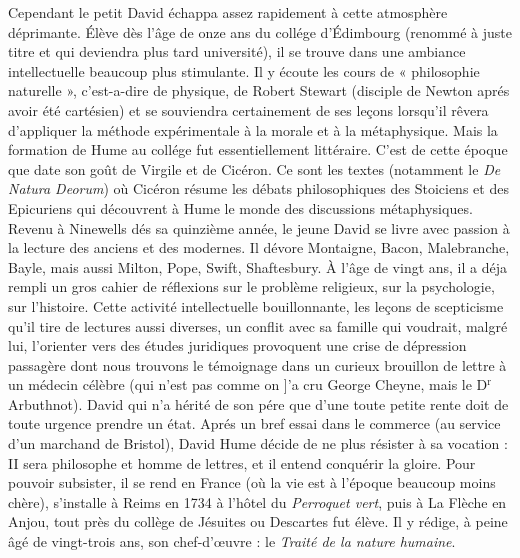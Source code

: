 Cependant le petit David échappa assez rapidement
à cette atmosphère déprimante. Élève dès
l'âge de onze ans du collége d’Édimbourg (renommé
à juste titre et qui deviendra plus tard université),
il se trouve dans une ambiance intellectuelle beaucoup 
plus stimulante. Il y écoute les cours de « philosophie
naturelle », c’est-a-dire de physique, de
Robert Stewart (disciple de Newton aprés avoir été
cartésien) et se souviendra certainement de ses
leçons lorsqu’il rêvera d’appliquer la méthode expérimentale
à la morale et à la métaphysique. Mais
la formation de Hume au collége fut essentiellement
littéraire. C’est de cette époque que date son goût
de Virgile et de Cicéron. Ce sont les textes (notamment
le {\it De Natura Deorum}) où Cicéron résume les
débats philosophiques des Stoiciens et des Epicuriens
qui découvrent à Hume le monde des discussions
métaphysiques. Revenu à Ninewells dés sa quinzième
année, le jeune David se livre avec passion à la
lecture des anciens et des modernes. Il dévore
Montaigne, Bacon, Malebranche, Bayle, mais aussi
Milton, Pope, Swift, Shaftesbury. À l’âge de vingt
ans, il a déja rempli un gros cahier de réflexions sur
le problème religieux, sur la psychologie, sur l’histoire.
Cette activité intellectuelle bouillonnante, les
leçons de scepticisme qu’il tire de lectures aussi
diverses, un conflit avec sa famille qui voudrait,
malgré lui, l'orienter vers des études juridiques
provoquent une crise de dépression passagère dont
nous trouvons le témoignage dans un curieux brouillon
de lettre à un médecin célèbre (qui n’est pas
comme on ]’a cru George Cheyne, mais le D$^\text{r}$ Arbuthnot).
David qui n’a hérité de son pére que d’une
toute petite rente doit de toute urgence prendre
un état. Aprés un bref essai dans le commerce (au
service d’un marchand de Bristol), David Hume
décide de ne plus résister à sa vocation : II sera
philosophe et homme de lettres, et il entend conquérir
la gloire. Pour pouvoir subsister, il se rend en France
(où la vie est à l’époque beaucoup moins chère),
s’installe à Reims en 1734 à l'hôtel du {\it Perroquet
vert}, puis à La Flèche en Anjou, tout près du collège
de Jésuites ou Descartes fut élève. Il y rédige, à
peine âgé de vingt-trois ans, son chef-d’{\oe}uvre :
le {\it Traité de la nature humaine}.

